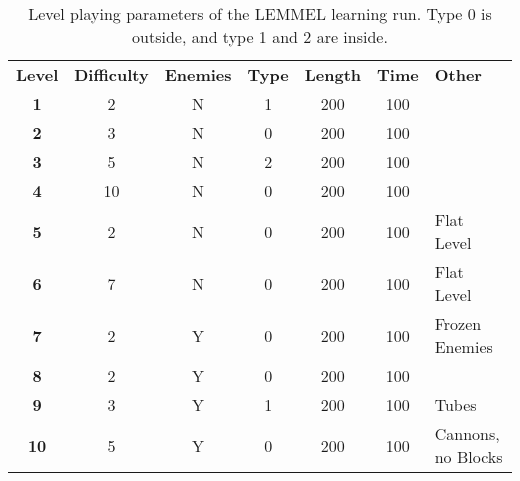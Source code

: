 \begin{table}
  \begin{adjustwidth}{-0cm}{-0cm}
  \begin{center} \footnotesize
    \begin{tabular}{ | c | c | c | c | c | c | l |}
    \hline
    \textbf{Level} & \textbf{Difficulty} & \textbf{Enemies} & \textbf{Type} & \textbf{Length} & \textbf{Time} & \textbf{Other} \TBstrut \\ \thickhline
    \textbf{1} & 2 & N & 1 & 200 & 100 &  \\ \hline
    \textbf{2} & 3 & N & 0 & 200 & 100 & \\ \hline
    \textbf{3} & 5 & N & 2 & 200 & 100 & \\ \hline
    \textbf{4} & 10 & N & 0 & 200 & 100 & \\ \hline
    \textbf{5} & 2 & N & 0 & 200 & 100 & Flat Level \\ \hline
    \textbf{6} & 7 & N & 0 & 200 & 100 & Flat Level \\ \hline
    \textbf{7} & 2 & Y & 0 & 200 & 100 & Frozen Enemies \\ \hline
    \textbf{8} & 2 & Y & 0 & 200 & 100 &  \\ \hline
    \textbf{9} & 3 & Y & 1 & 200 & 100 & Tubes \\ \hline
    \textbf{10} & 5 & Y & 0 & 200 & 100 & Cannons, no Blocks \\ \hline
    \end{tabular}
  \end{center}
  \end{adjustwidth}
  \caption{Level playing parameters of the LEMMEL learning run. Type 0 is outside, and type 1 and 2 are inside. }
  \label{tab:evalparams}
\end{table}

